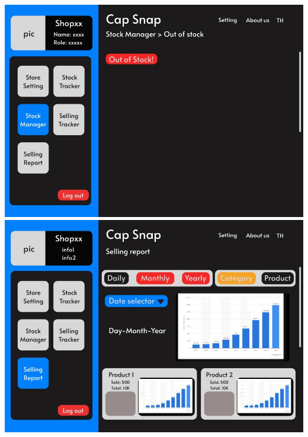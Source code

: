 {
 \includegraphics[scale=0.9]{pic/ui/11.jpg}
 \includegraphics[scale=0.9]{pic/ui/12.jpg}
}
 
    
    

